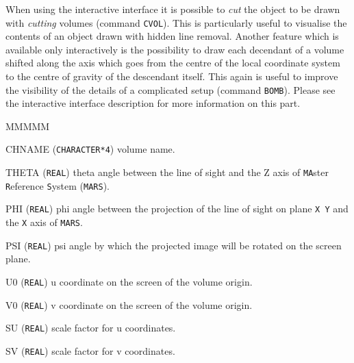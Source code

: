 When using the interactive interface it is possible to {\it cut}
the object to be drawn with {\it cutting} volumes (command {\tt CVOL}).
This is particularly
useful to visualise the contents of an object drawn with hidden line removal.
Another feature which is available only interactively is the possibility
to draw each decendant of a volume shifted along the axis which goes from the
centre of the local coordinate system to the centre of gravity of
the descendant itself. This again is useful to improve the visibility of the
details of a complicated setup (command {\tt BOMB}). Please see the interactive
interface description for more information on this part.

\begin{DLtt}{MMMMM}
\item[CHNAME]  ({\tt CHARACTER*4}) volume name.
\item[THETA] ({\tt REAL}) theta angle between the line of sight and the
Z axis of {\tt MA}ster {\tt R}eference {\tt S}ystem ({\tt MARS}).
\item[PHI]   ({\tt REAL}) phi angle between the projection of the line 
of sight on plane {\tt X  Y} and the {\tt X} axis of {\tt MARS}.
\item[PSI]   ({\tt REAL}) psi angle by which the projected image will 
be rotated on the screen plane.
\item[U0]    ({\tt REAL}) u coordinate on the screen of the volume origin.
\item[V0]    ({\tt REAL}) v coordinate on the screen of the volume origin.
\item[SU]    ({\tt REAL}) scale factor for u coordinates.
\item[SV]    ({\tt REAL}) scale factor for v coordinates.
\end{DLtt}
